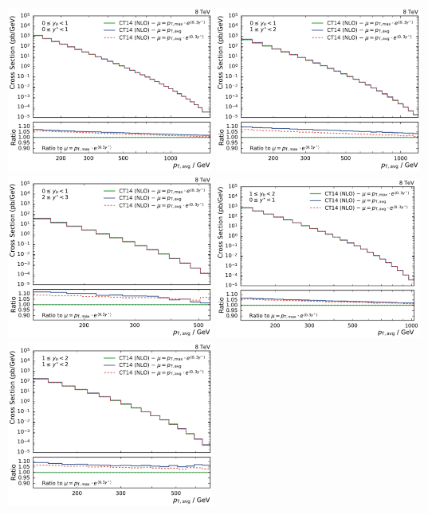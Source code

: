 \begin{figure}[htp]
    \centering
    \includegraphics[width=0.48\textwidth]{figures/theory/nlo_xs_comp_yb0ys0.pdf}\hfill
    \includegraphics[width=0.48\textwidth]{figures/theory/nlo_xs_comp_yb0ys1.pdf}
    \includegraphics[width=0.48\textwidth]{figures/theory/nlo_xs_comp_yb0ys2.pdf}\hfill
    \includegraphics[width=0.48\textwidth]{figures/theory/nlo_xs_comp_yb1ys0.pdf}
    \includegraphics[width=0.48\textwidth]{figures/theory/nlo_xs_comp_yb1ys1.pdf}\hfill

\end{figure}
